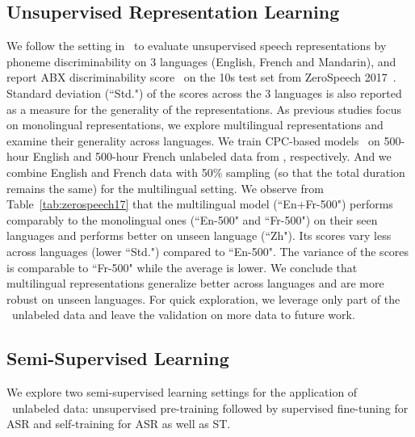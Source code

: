 \subsection{Unsupervised Representation Learning}
\label{sec:representation_learning}
We follow the setting in~\citet{riviere2020unsupervised} to evaluate unsupervised speech representations by phoneme discriminability on 3 languages (English, French and Mandarin), and report ABX discriminability score~\citep{schatz2013evaluating} on the 10s test set from ZeroSpeech 2017~\citep{dunbar2017zero}. Standard deviation (``Std.") of the scores across the 3 languages is also reported as a measure for the generality of the representations. 
As previous studies focus on monolingual representations, we explore multilingual representations and examine their generality across languages.
We train CPC-based models~\citep{riviere2020unsupervised_wild} on 500-hour English and 500-hour French unlabeled data from \vp, respectively. And we combine English and French data with 50\% sampling (so that the total duration remains the same) for the multilingual setting.
We observe from Table~\ref{tab:zerospeech17} that the multilingual model (``En+Fr-500") performs comparably to the monolingual ones (``En-500" and ``Fr-500") on their seen languages and performs better on unseen language (``Zh"). Its scores vary less across languages (lower ``Std.") compared to ``En-500". The variance of the scores is comparable to ``Fr-500" while the average is lower. We conclude that multilingual representations generalize better across languages and are more robust on unseen languages. For quick exploration, we leverage only part of the \vp~unlabeled data and leave the validation on more data to future work.

\subsection{Semi-Supervised Learning}
We explore two semi-supervised learning settings for the application of \vp~unlabeled data: unsupervised pre-training followed by supervised fine-tuning for ASR and self-training for ASR as well as ST.
